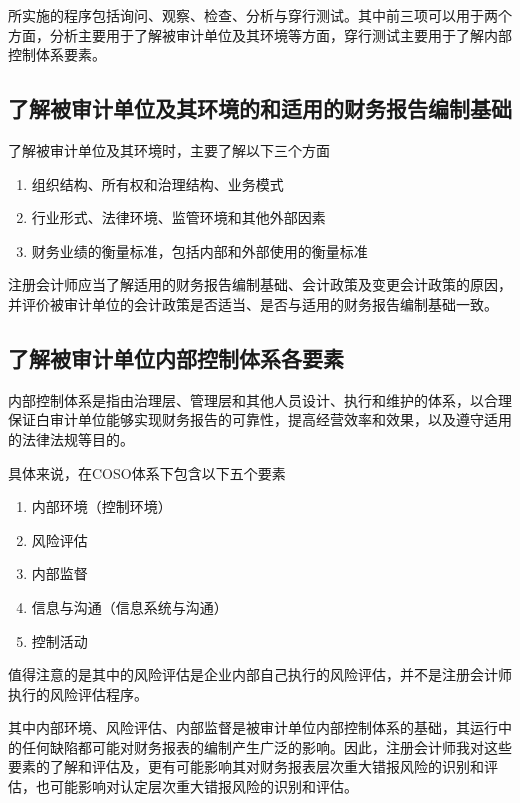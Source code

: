 \documentclass[UTF8,12pt]{ctexart}
\numberwithin{equation}{section} %
\numberwithin{figure}{section}
\numberwithin{table}{section}
\begin{document}
	所实施的程序包括询问、观察、检查、分析与穿行测试。其中前三项可以用于两个方面，分析主要用于了解被审计单位及其环境等方面，穿行测试主要用于了解内部控制体系要素。
	
	
	
	\subsection{了解被审计单位及其环境的和适用的财务报告编制基础}
	了解被审计单位及其环境时，主要了解以下三个方面
	\begin{enumerate}
		\item 组织结构、所有权和治理结构、业务模式
		
		\item 行业形式、法律环境、监管环境和其他外部因素
		
		\item 财务业绩的衡量标准，包括内部和外部使用的衡量标准
	\end{enumerate}
	
	注册会计师应当了解适用的财务报告编制基础、会计政策及变更会计政策的原因，并评价被审计单位的会计政策是否适当、是否与适用的财务报告编制基础一致。
	
	\subsection{了解被审计单位内部控制体系各要素}
	内部控制体系是指由治理层、管理层和其他人员设计、执行和维护的体系，以合理保证白审计单位能够实现财务报告的可靠性，提高经营效率和效果，以及遵守适用的法律法规等目的。
	
	具体来说，在COSO体系下包含以下五个要素
	\begin{enumerate}
		\item 内部环境（控制环境）
		
		\item 风险评估
		
		\item 内部监督
		
		\item 信息与沟通（信息系统与沟通）
		
		\item 控制活动
	\end{enumerate}
	值得注意的是其中的风险评估是企业内部自己执行的风险评估，并不是注册会计师执行的风险评估程序。
	
	其中内部环境、风险评估、内部监督是被审计单位内部控制体系的基础，其运行中的任何缺陷都可能对财务报表的编制产生广泛的影响。因此，注册会计师我对这些要素的了解和评估及，更有可能影响其对财务报表层次重大错报风险的识别和评估，也可能影响对认定层次重大错报风险的识别和评估。
	
\end{document}
